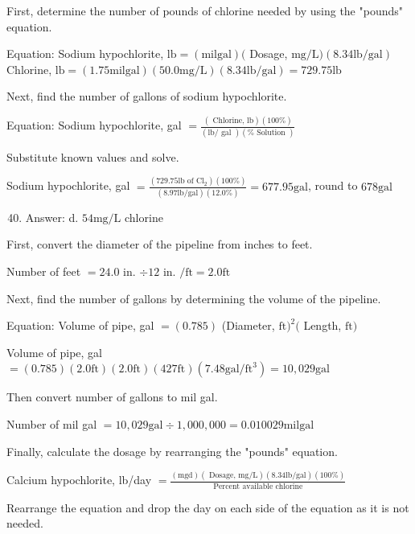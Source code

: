 \documentclass[10pt]{article}
\begin{document}
First, determine the number of pounds of chlorine needed by using the "pounds" equation.

Equation: Sodium hypochlorite, $\mathrm{lb}=(\mathrm{mil} \mathrm{gal})($ Dosage, $\mathrm{mg} / \mathrm{L})(8.34 \mathrm{lb} / \mathrm{gal})$ Chlorine, $\mathrm{lb}=(1.75 \mathrm{mil} \mathrm{gal})(50.0 \mathrm{mg} / \mathrm{L})(8.34 \mathrm{lb} / \mathrm{gal})=729.75 \mathrm{lb}$

Next, find the number of gallons of sodium hypochlorite.

Equation: Sodium hypochlorite, gal $=\frac{(\text { Chlorine, } \mathrm{lb})(100 \%)}{(\mathrm{lb} / \text { gal })(\% \text { Solution })}$

Substitute known values and solve.

Sodium hypochlorite, gal $=\frac{\left(729.75 \mathrm{lb} \text { of } \mathrm{Cl}_{2}\right)(100 \%)}{(8.97 \mathrm{lb} / \mathrm{gal})(12.0 \%)}=677.95 \mathrm{gal}$, round to $678 \mathrm{gal}$

\begin{enumerate}
  \setcounter{enumi}{39}
  \item Answer: d. $54 \mathrm{mg} / \mathrm{L}$ chlorine
\end{enumerate}

First, convert the diameter of the pipeline from inches to feet.

Number of feet $=24.0$ in. $\div 12$ in. $/ \mathrm{ft}=2.0 \mathrm{ft}$

Next, find the number of gallons by determining the volume of the pipeline.

Equation: Volume of pipe, gal $=(0.785)$ (Diameter, $\mathrm{ft})^{2}($ Length, $\mathrm{ft})$

Volume of pipe, gal $=(0.785)(2.0 \mathrm{ft})(2.0 \mathrm{ft})(427 \mathrm{ft})\left(7.48 \mathrm{gal} / \mathrm{ft}^{3}\right)=10,029 \mathrm{gal}$

Then convert number of gallons to mil gal.

Number of mil gal $=10,029 \mathrm{gal} \div 1,000,000=0.010029 \mathrm{mil} \mathrm{gal}$

Finally, calculate the dosage by rearranging the "pounds" equation.

Calcium hypochlorite, lb/day $=\frac{(\mathrm{mgd})(\text { Dosage, } \mathrm{mg} / \mathrm{L})(8.34 \mathrm{lb} / \mathrm{gal})(100 \%)}{\text { Percent available chlorine }}$

Rearrange the equation and drop the day on each side of the equation as it is not needed.
\end{document}
